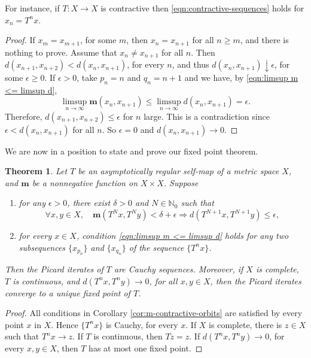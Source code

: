 \documentclass[a4paper,10pt,twoside,reqno]{amsart}
\newtheorem{thm}{Theorem}[section]
\theoremstyle{definition}
\theoremstyle{remark}
\newcommand{\de}{\delta}
\newcommand{\e}{\epsilon}
\newcommand{\N}{\mathbb{N}}
\newcommand{\m}{\mathbf{m}}
\numberwithin{equation}{section}
\begin{document}
For instance, if $T:X\to X$ is contractive %
then \eqref{eqn:contractive-sequences} holds for $x_n=T^nx$.

\begin{proof}
 If $x_m=x_{m+1}$, for some $m$, then $x_n=x_{n+1}$ for all $n\geq m$,
 and there is nothing to prove. Assume that $x_n\neq x_{n+1}$ for all $n$.
 Then $d(x_{n+1},x_{n+2})< d(x_n,x_{n+1})$, for every $n$, and thus
 $d(x_n,x_{n+1}) \downarrow \e$, for some $\e\geq0$.
 If $\e>0$, take $p_n=n$ and $q_n=n+1$ and we have, by \eqref{eqn:limsup m <= limsup d},
 \[
   \limsup_{n\to\infty} \m(x_n,x_{n+1})
    \leq \limsup_{n\to\infty} d(x_n,x_{n+1})=\e.
 \]
 Therefore, $d(x_{n+1},x_{n+2}) \leq \e$ for $n$ large.
 This is a contradiction since $\e<d(x_n,x_{n+1})$ for all $n$.
 So $\e=0$ and $d(x_n,x_{n+1})\to0$.
\end{proof}

We are now in a position to state and prove our fixed point theorem.

\begin{thm}
\label{thm:fixed-point-theorem}
  Let $T$ be an asymptotically regular self-map of a metric space $X$, and
  $\m$ be a nonnegative function on $X\times X$.
  Suppose
  \begin{enumerate}[\upshape(i)]
    \item \label{item:m-contractive-in-pre-fixed-point-theorem}
    for any $\e>0$, there exist $\de>0$ and $N\in\N_0$ such that
    \begin{equation}\label{eqn:m-contractive-in-fixed-point-theorem}
      \forall x,y\in X, \quad
       \m(T^Nx, T^Ny) < \de+\e \Longrightarrow d(T^{N+1}x,T^{N+1}y)\leq \e,
    \end{equation}

    \item \label{item:m-satisfies-in-pre-fixed-point-theorem}
    for every $x\in X$, condition \eqref{eqn:limsup m <= limsup d}
    holds for any two subsequences $\{x_{p_n}\}$ and $\{x_{q_n}\}$
    of the sequence $\{T^nx\}$.
  \end{enumerate}
  Then the Picard iterates of $T$ are Cauchy sequences.
  Moreover, if $X$ is complete, $T$ is continuous, and $d(T^nx,T^ny)\to0$,
  for all $x,y\in X$, then the Picard iterates converge to a unique fixed point
  of $T$.
\end{thm}

\begin{proof}
  All conditions in Corollary \ref{cor:m-contractive-orbits} are satisfied by every
  point $x$ in $X$. Hence $\{T^nx\}$ is Cauchy, for every $x$.
  If $X$ is complete, there is $z\in X$ such that $T^nx\to z$. If $T$ is continuous,
  then $Tz=z$. If $d(T^nx,T^ny)\to0$, for every $x,y\in X$, then $T$ has
  at most one fixed point.
\end{proof}
\end{document}
